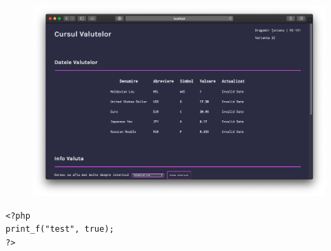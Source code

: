 \documentclass[12pt. a4paper]{report}
\begin{document}
\begin{figure}
\centering
	\includegraphics[width=1.0\textwidth]{homepage}
\end{figure}



\begin{verbatim}
<?php
print_f("test", true);
?>
\end{verbatim}
\end{document}

